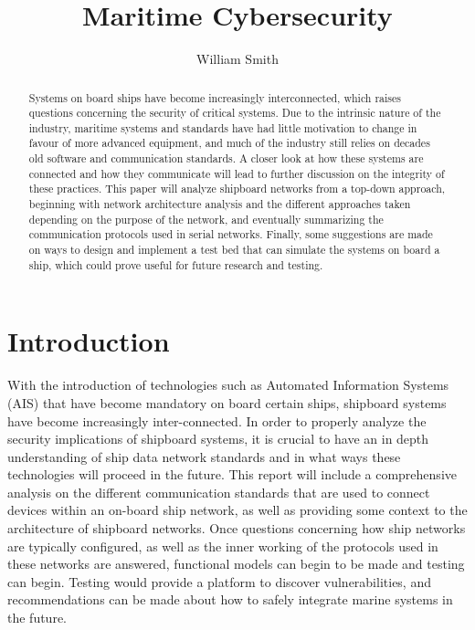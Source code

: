 \documentclass{report}
\title{Maritime Cybersecurity}
\author{William Smith}
\begin{document}
\maketitle
\doublespacing

\begin{abstract}
Systems on board ships have become increasingly interconnected, which raises questions concerning the security of critical systems. Due to the intrinsic nature of the industry, maritime systems and standards have had little motivation to change in favour of more advanced equipment, and much of the industry still relies on decades old software and communication standards. A closer look at how these systems are connected and how they communicate will lead to further discussion on the integrity of these practices. This paper will analyze shipboard networks from a top-down approach, beginning with network architecture analysis and the different approaches taken depending on the purpose of the network, and eventually summarizing the communication protocols used in serial networks. Finally, some suggestions are made on ways to design and implement a test bed that can simulate the systems on board a ship, which could prove useful for future research and testing. 
\end{abstract}

\tableofcontents

\chapter{Introduction}

With the introduction of technologies such as Automated Information Systems (AIS) that have become mandatory on board certain ships, shipboard systems have become increasingly inter-connected. In order to properly analyze the security implications of shipboard systems, it is crucial to have an in depth understanding of ship data network standards and in what ways these technologies will proceed in the future. This report will include a comprehensive analysis on the different communication standards that are used to connect devices within an on-board ship network, as well as providing some context to the architecture of shipboard networks. Once questions concerning how ship networks are typically configured, as well as the inner working of the protocols used in these networks are answered, functional models can begin to be made and testing can begin. Testing would provide a platform to discover vulnerabilities, and recommendations can be made about how to safely integrate marine systems in the future. 
\end{document}
